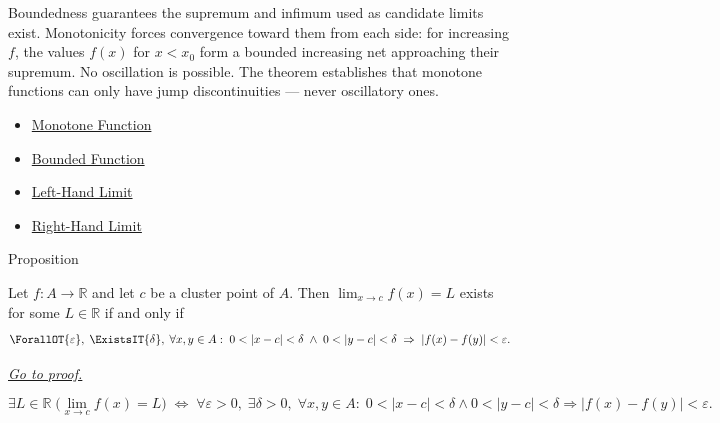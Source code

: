 \begin{remark*}[Interpretation]
Boundedness guarantees the supremum and infimum used as candidate
limits exist. Monotonicity forces convergence toward them from each
side: for increasing $f$, the values $f(x)$ for $x < x_0$ form a
bounded increasing net approaching their supremum. No oscillation is
possible. The theorem establishes that monotone functions can only
have jump discontinuities — never oscillatory ones.
\end{remark*}

\begin{dependencies}
\begin{itemize}
  \item \hyperref[def:function-monotone]{Monotone Function}
  \item \hyperref[def:function-bounded]{Bounded Function}
  \item \hyperref[def:left-hand-limit]{Left-Hand Limit}
  \item \hyperref[def:right-hand-limit]{Right-Hand Limit}
\end{itemize}
\end{dependencies}


\begin{propositionbox}{Proposition}
\begin{proposition}
\label{prop:cauchy-criterion-limits}
Let $f : A \to \mathbb{R}$ and let $c$ be a cluster point of $A$.
Then $\lim_{x\to c}f(x)=L$ exists for some
$L \in \mathbb{R}$ if and only if
\[
  \ForallOT{\varepsilon},\;
  \ExistsIT{\delta},\;
  \forall x, y \in A :\;
  0<|x-c|<\delta
  \;\wedge\;
  0<|y-c|<\delta
  \;\Rightarrow\;
  |f(x)-f(y)|<\varepsilon.
\]

\smallskip\noindent
\hyperref[prf:cauchy-criterion-limits]{\textit{Go to proof.}}
\end{proposition}
\end{propositionbox}

\begin{remark*}
\[
  \exists L \in \mathbb{R}\;\bigl(\lim_{x\to c}f(x)=L\bigr)
  \;\iff\;
  \forall\varepsilon>0,\;\exists\delta>0,\;
  \forall x,y \in A :\;
  0<|x-c|<\delta \wedge 0<|y-c|<\delta
  \Rightarrow |f(x)-f(y)|<\varepsilon.
\]
\end{remark*}

